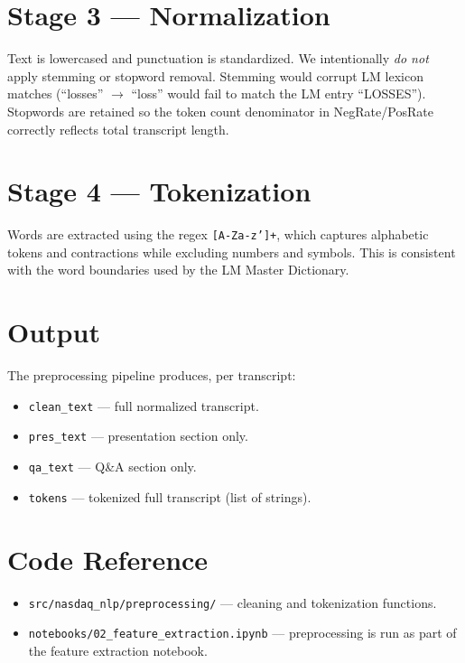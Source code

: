 \documentclass[12pt,a4paper]{article}
\begin{document}
\section{Stage 3 --- Normalization}

Text is lowercased and punctuation is standardized.
We intentionally \emph{do not} apply stemming or stopword removal.
Stemming would corrupt LM lexicon matches (``losses'' $\rightarrow$ ``loss'' would
fail to match the LM entry ``LOSSES'').
Stopwords are retained so the token count denominator in NegRate/PosRate correctly
reflects total transcript length.

\section{Stage 4 --- Tokenization}

Words are extracted using the regex \texttt{[A-Za-z']+}, which captures
alphabetic tokens and contractions while excluding numbers and symbols.
This is consistent with the word boundaries used by the LM Master Dictionary.

\section{Output}

The preprocessing pipeline produces, per transcript:
\begin{itemize}
  \item \texttt{clean\_text} --- full normalized transcript.
  \item \texttt{pres\_text} --- presentation section only.
  \item \texttt{qa\_text} --- Q\&A section only.
  \item \texttt{tokens} --- tokenized full transcript (list of strings).
\end{itemize}

\section{Code Reference}

\begin{itemize}
  \item \texttt{src/nasdaq\_nlp/preprocessing/} --- cleaning and tokenization functions.
  \item \texttt{notebooks/02\_feature\_extraction.ipynb} --- preprocessing is run as part
        of the feature extraction notebook.
\end{itemize}
\end{document}
